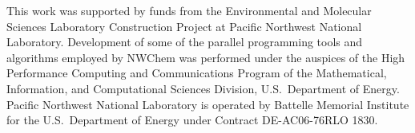 
This work was supported by funds from the Environmental and Molecular
Sciences Laboratory Construction Project at Pacific Northwest National
Laboratory.  Development of some of the parallel programming tools and
algorithms employed by NWChem was performed under the auspices of the
High Performance Computing and Communications Program of the
Mathematical, Information, and Computational Sciences Division, U.S.\
Department of Energy.  Pacific Northwest National Laboratory is
operated by Battelle Memorial Institute for the U.S.\ Department of
Energy under Contract DE-AC06-76RLO 1830.


